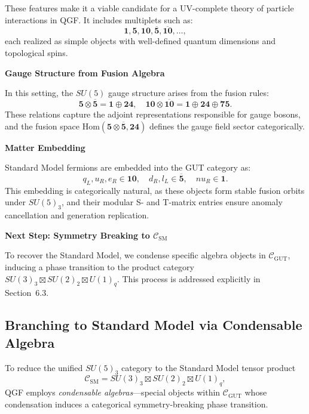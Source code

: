 \documentclass[11pt]{article}
\def\nu{nu}
\begin{document}
These features make it a viable candidate for a UV-complete theory of particle interactions in QGF. It includes multiplets such as:
\[
\mathbf{1}, \mathbf{5}, \mathbf{10}, \overline{\mathbf{5}}, \overline{\mathbf{10}}, \ldots,
\]
each realized as simple objects with well-defined quantum dimensions and topological spins.

\vspace{0.5em}
\noindent\textbf{Gauge Structure from Fusion Algebra}

In this setting, the \( SU(5) \) gauge structure arises from the fusion rules:
\[
\mathbf{5} \otimes \overline{\mathbf{5}} = \mathbf{1} \oplus \mathbf{24}, \quad \mathbf{10} \otimes \overline{\mathbf{10}} = \mathbf{1} \oplus \mathbf{24} \oplus \mathbf{75}.
\]
These relations capture the adjoint representations responsible for gauge bosons, and the fusion space \( \text{Hom}(\mathbf{5} \otimes \overline{\mathbf{5}}, \mathbf{24}) \) defines the gauge field sector categorically.

\vspace{0.5em}
\noindent\textbf{Matter Embedding}

Standard Model fermions are embedded into the GUT category as:
\[
q_L, u_R, e_R \in \mathbf{10}, \quad d_R, l_L \in \overline{\mathbf{5}}, \quad \nu_R \in \mathbf{1}.
\]
This embedding is categorically natural, as these objects form stable fusion orbits under \( SU(5)_3 \), and their modular S- and T-matrix entries ensure anomaly cancellation and generation replication.

\vspace{0.5em}
\noindent\textbf{Next Step: Symmetry Breaking to \( \mathcal{C}_{\text{SM}} \)}

To recover the Standard Model, we condense specific algebra objects in \( \mathcal{C}_{\text{GUT}} \), inducing a phase transition to the product category \( SU(3)_3 \boxtimes SU(2)_2 \boxtimes U(1)_q \). This process is addressed explicitly in Section~6.3.




\subsection{Branching to Standard Model via Condensable Algebra}

To reduce the unified \( SU(5)_3 \) category to the Standard Model tensor product
\[
\mathcal{C}_{\text{SM}} = SU(3)_3 \boxtimes SU(2)_2 \boxtimes U(1)_q,
\]
QGF employs \textit{condensable algebras}—special objects within \( \mathcal{C}_{\text{GUT}} \) whose condensation induces a categorical symmetry-breaking phase transition.
\end{document}
